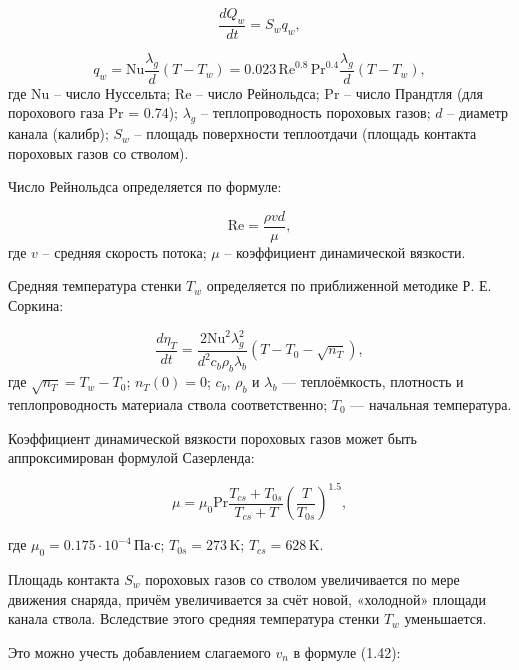\documentclass[14pt, a4paper]{report} %
\begin{document}
\begin{equation}
\frac{dQ_{w}}{dt} = S_{w} q_{w},
\end{equation}

\begin{equation}
q_{w} = \mathrm{Nu} \frac{\lambda_g}{d} (T - T_{w}) = 0.023 \, \mathrm{Re}^{0.8} \, \mathrm{Pr}^{0.4} \frac{\lambda_g}{d} (T - T_{w}),
\end{equation}
где Nu -- число Нуссельта; Re -- число Рейнольдса; Pr -- число Прандтля (для порохового газа Pr = 0.74); $\lambda_g$ -- теплопроводность пороховых газов; $d$ -- диаметр канала (калибр); $S_w$ -- площадь поверхности теплоотдачи (площадь контакта пороховых газов со стволом).

Число Рейнольдса определяется по формуле:

\begin{equation}
\mathrm{Re} = \frac{\rho v d}{\mu},
\end{equation}
где $v$ -- средняя скорость потока; $\mu$ -- коэффициент динамической вязкости.
 
Средняя температура стенки \( T_w \) определяется по приближенной методике Р. Е. Соркина:

\begin{equation}
\frac{d\eta_T}{dt} = \frac{2 \mathrm{Nu}^2 \lambda_g^2}{d^2 c_b \rho_b \lambda_b} \left( T - T_0 - \sqrt{n_T} \right),
\end{equation}
где \( \sqrt{n_T} = T_w - T_0 \); \( n_T(0) = 0 \); \( c_b, \, \rho_b \) и \( \lambda_b \) — теплоёмкость, плотность и теплопроводность материала ствола соответственно; \( T_0 \) — начальная температура.

Коэффициент динамической вязкости пороховых газов может быть аппроксимирован формулой Сазерленда:

\begin{equation}
\mu = \mu_0 \mathrm{Pr} \frac{T_{cs} + T_{0s}}{T_{cs} + T} \left( \frac{T}{T_{0s}} \right)^{1.5},
\tag{1.43}
\end{equation}

где \( \mu_0 = 0.175 \cdot 10^{-4} \, \text{Па·с} \); \( T_{0s} = 273 \, \text{K} \); \( T_{cs} = 628 \, \text{K} \).

Площадь контакта \( S_w \) пороховых газов со стволом увеличивается по мере движения снаряда, причём увеличивается за счёт новой, «холодной» площади канала ствола. Вследствие этого средняя температура стенки \( T_w \) уменьшается.

Это можно учесть добавлением слагаемого \( v_n \) в формуле (1.42):
\end{document}
